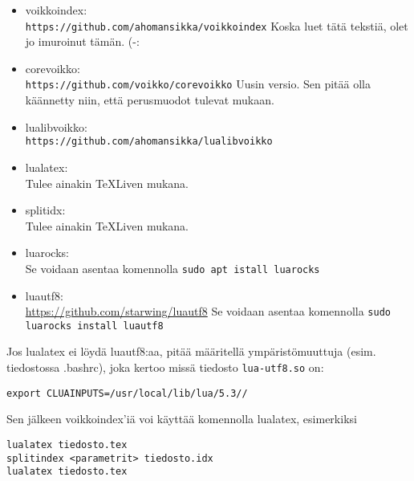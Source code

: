 \documentclass[12pt]{article}
\begin{document}
\begin{itemize}
\item voikkoindex: \\
      \verb=https://github.com/ahomansikka/voikkoindex=
      Koska luet tätä tekstiä, olet jo imuroinut tämän. (-:

\item corevoikko: \\
      \verb=https://github.com/voikko/corevoikko=
      Uusin versio. Sen pitää olla käännetty niin, että perusmuodot
      tulevat mukaan.

\item lualibvoikko: \\
      \verb=https://github.com/ahomansikka/lualibvoikko=

\item lualatex: \\
      Tulee ainakin TeXLiven mukana.

\item splitidx: \\
      Tulee ainakin TeXLiven mukana.

\item luarocks: \\
      Se voidaan asentaa komennolla
      \verb=sudo apt istall luarocks=

\item luautf8: \\
      \url{https://github.com/starwing/luautf8}
      Se voidaan asentaa komennolla
      \verb=sudo luarocks install luautf8=
\end{itemize}


Jos lualatex ei löydä luautf8:aa, pitää määritellä ympäristömuuttuja
(esim. tiedostossa .bashrc), joka kertoo missä tiedosto
\verb=lua-utf8.so= on:

\verb|export CLUAINPUTS=/usr/local/lib/lua/5.3//|

Sen jälkeen voikkoindex'iä voi käyttää komennolla lualatex, esimerkiksi

\begin{verbatim}
lualatex tiedosto.tex
splitindex <parametrit> tiedosto.idx
lualatex tiedosto.tex
\end{verbatim}


\newpage \printindex[nimet]
\newpage \printindex[paikat]
\newpage \printindex[sanat]
\end{document}
